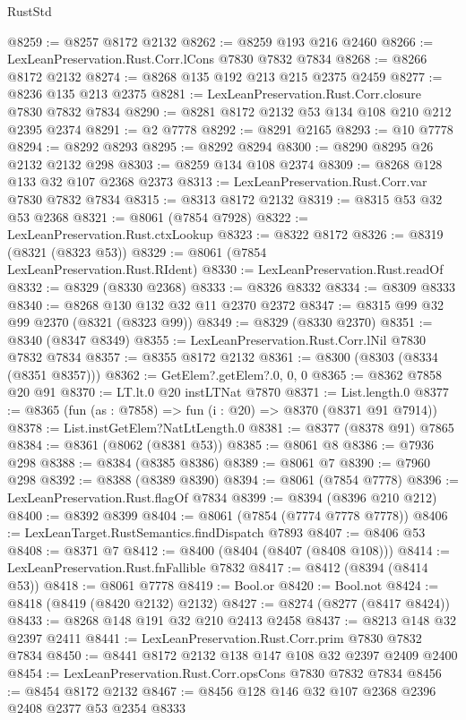 \begin{lexlean}{RustStd}
\begin{coremodule}
{\begin{coremodule}
{{{{{{{{{{{{{{{{{{{{{{{{{{{{{{{{{{{{{@8259 := @8257 @8172 @2132
@8262 := @8259 @193 @216 @2460
@8266 := LexLeanPreservation.Rust.Corr.lCons @7830 @7832 @7834
@8268 := @8266 @8172 @2132
@8274 := @8268 @135 @192 @213 @215 @2375 @2459
@8277 := @8236 @135 @213 @2375
@8281 := LexLeanPreservation.Rust.Corr.closure @7830 @7832 @7834
@8290 := @8281 @8172 @2132 @53 @134 @108 @210 @212 @2395 @2374
@8291 := @2 @7778
@8292 := @8291 @2165
@8293 := @10 @7778
@8294 := @8292 @8293
@8295 := @8292 @8294
@8300 := @8290 @8295 @26 @2132 @2132 @298
@8303 := @8259 @134 @108 @2374
@8309 := @8268 @128 @133 @32 @107 @2368 @2373
@8313 := LexLeanPreservation.Rust.Corr.var @7830 @7832 @7834
@8315 := @8313 @8172 @2132
@8319 := @8315 @53 @32 @53 @2368
@8321 := @8061 (@7854 @7928)
@8322 := LexLeanPreservation.Rust.ctxLookup
@8323 := @8322 @8172
@8326 := @8319 (@8321 (@8323 @53))
@8329 := @8061 (@7854 LexLeanPreservation.Rust.RIdent)
@8330 := LexLeanPreservation.Rust.readOf
@8332 := @8329 (@8330 @2368)
@8333 := @8326 @8332
@8334 := @8309 @8333
@8340 := @8268 @130 @132 @32 @11 @2370 @2372
@8347 := @8315 @99 @32 @99 @2370 (@8321 (@8323 @99))
@8349 := @8329 (@8330 @2370)
@8351 := @8340 (@8347 @8349)
@8355 := LexLeanPreservation.Rust.Corr.lNil @7830 @7832 @7834
@8357 := @8355 @8172 @2132
@8361 := @8300 (@8303 (@8334 (@8351 @8357)))
@8362 := GetElem?.getElem?.{0, 0, 0}
@8365 := @8362 @7858 @20 @91
@8370 := LT.lt.{0} @20 instLTNat @7870
@8371 := List.length.{0}
@8377 := @8365 (fun (as : @7858) => fun (i : @20) => @8370 (@8371 @91 @7914))
@8378 := List.instGetElem?NatLtLength.{0}
@8381 := @8377 (@8378 @91) @7865
@8384 := @8361 (@8062 (@8381 @53))
@8385 := @8061 @8
@8386 := @7936 @298
@8388 := @8384 (@8385 @8386)
@8389 := @8061 @7
@8390 := @7960 @298
@8392 := @8388 (@8389 @8390)
@8394 := @8061 (@7854 @7778)
@8396 := LexLeanPreservation.Rust.flagOf @7834
@8399 := @8394 (@8396 @210 @212)
@8400 := @8392 @8399
@8404 := @8061 (@7854 (@7774 @7778 @7778))
@8406 := LexLeanTarget.RustSemantics.findDispatch @7893
@8407 := @8406 @53
@8408 := @8371 @7
@8412 := @8400 (@8404 (@8407 (@8408 @108)))
@8414 := LexLeanPreservation.Rust.fnFallible @7832
@8417 := @8412 (@8394 (@8414 @53))
@8418 := @8061 @7778
@8419 := Bool.or
@8420 := Bool.not
@8424 := @8418 (@8419 (@8420 @2132) @2132)
@8427 := @8274 (@8277 (@8417 @8424))
@8433 := @8268 @148 @191 @32 @210 @2413 @2458
@8437 := @8213 @148 @32 @2397 @2411
@8441 := LexLeanPreservation.Rust.Corr.prim @7830 @7832 @7834
@8450 := @8441 @8172 @2132 @138 @147 @108 @32 @2397 @2409 @2400
@8454 := LexLeanPreservation.Rust.Corr.opsCons @7830 @7832 @7834
@8456 := @8454 @8172 @2132
@8467 := @8456 @128 @146 @32 @107 @2368 @2396 @2408 @2377 @53 @2354 @8333
}}}}}}}}}}}}}}}}}}}}}}}}}}}}}}}}}}}}}
\end{coremodule}}
\end{coremodule}
\end{lexlean}

